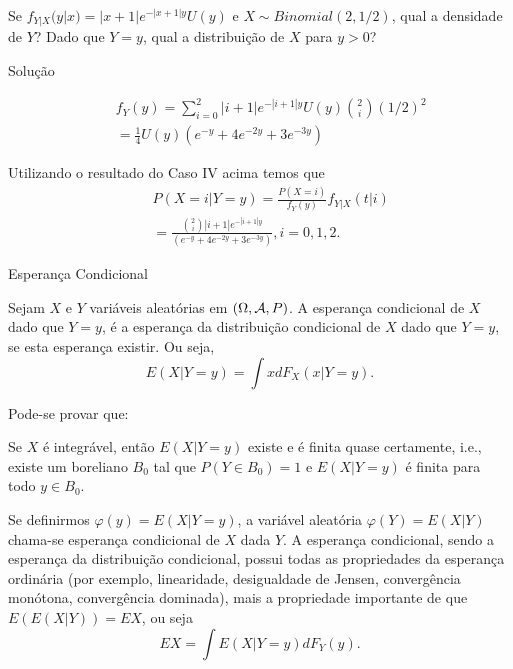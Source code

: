 \begin{frame}

\begin{exem}
Se $f_{Y|X}(y|x)=|x+1|e^{-|x+1|y}U(y)$ e $X\sim Binomial(2,1/2)$, qual a densidade de $Y$? Dado que $Y=y$, qual a distribuição de $X$ para $y>0$?
\end{exem}


\begin{block}{Solução}

\begin{eqnarray}
& & f_Y(y)=\sum_{i=0}^{2}|i+1|e^{-|i+1|y}U(y)\binom{2}{i}(1/2)^2 \nonumber \\
& & =\frac{1}{4}U(y)(e^{-y}+4e^{-2y}+3e^{-3y}) \nonumber
\end{eqnarray}

Utilizando o resultado do Caso IV acima temos que
\begin{eqnarray}
& & P(X=i|Y=y)=\frac{P(X=i)}{f_Y(y)}f_{Y|X}(t|i) \nonumber \\
& & =\frac{\binom{2}{i}|i+1|e^{-|i+1|y}}{(e^{-y}+4e^{-2y}+3e^{-3y})}, i=0,1,2. \nonumber
\end{eqnarray}

\end{block}
\end{frame}

\begin{frame}{Esperança Condicional}

\begin{defi}
Sejam $X$ e $Y$ variáveis aleatórias em $(\Omega,{\cal A},P)$. A esperança
condicional de $X$ dado que $Y=y$, é a esperança da distribuição
condicional de $X$ dado que $Y=y$, se esta esperança existir. Ou
seja,
$$E(X|Y=y)=\int x dF_X(x|Y=y).$$
\end{defi}

Pode-se provar que:

\begin{teo}
	Se $X$ é integrável, então $E(X|Y=y)$ existe e é finita quase
	certamente, i.e., existe um boreliano $B_0$ tal que $P(Y\in B_0)=1$
	e $E(X|Y=y)$ é finita para todo $y\in B_0$.
\end{teo}

Se definirmos $\varphi(y)=E(X|Y=y)$, a variável aleatória
$\varphi(Y)=E(X|Y)$ chama-se esperança condicional de $X$ dada $Y$.
A esperança condicional, sendo a esperança da distribuição
condicional, possui todas as propriedades da esperança ordinária
(por exemplo, linearidade, desigualdade de Jensen, convergência
monótona, convergência dominada), mais a propriedade importante de
que $E(E(X|Y))=EX$, ou seja
$$EX=\int E(X|Y=y)dF_Y(y).$$

\end{frame}

